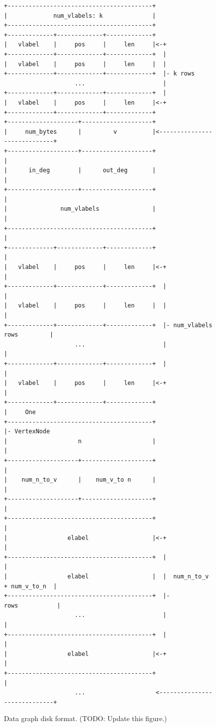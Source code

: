 \begin{figure}[ht]
  \centering
  \begin{verbatim}
+-----------------------------------------+
|             num_vlabels: k              |
+-----------------------------------------+
+-------------+-------------+-------------+
|   vlabel    |     pos     |     len     |<-+
+-------------+-------------+-------------+  |
|   vlabel    |     pos     |     len     |  |
+-------------+-------------+-------------+  |- k rows
                    ...                      |
+-------------+-------------+-------------+  |
|   vlabel    |     pos     |     len     |<-+
+-------------+-------------+-------------+
+--------------------+--------------------+
|     num_bytes      |         v          |<-----------------------------+
+--------------------+--------------------+                              |
|      in_deg        |      out_deg       |                              |
+--------------------+--------------------+                              |
|               num_vlabels               |                              |
+-----------------------------------------+                              |
+-------------+-------------+-------------+                              |
|   vlabel    |     pos     |     len     |<-+                           |
+-------------+-------------+-------------+  |                           |
|   vlabel    |     pos     |     len     |  |                           |
+-------------+-------------+-------------+  |- num_vlabels rows         |
                    ...                      |                           |
+-------------+-------------+-------------+  |                           |
|   vlabel    |     pos     |     len     |<-+                           |
+-------------+-------------+-------------+                              |     One
+-----------------------------------------+                              |- VertexNode
|                    n                    |                              |
+--------------------+--------------------+                              |
|    num_n_to_v      |    num_v_to n      |                              |
+--------------------+--------------------+                              |
+-----------------------------------------+                              |
|                 elabel                  |<-+                           |
+-----------------------------------------+  |                           |
|                 elabel                  |  |  num_n_to_v + num_v_to_n  |
+-----------------------------------------+  |-           rows           |
                    ...                      |                           |
+-----------------------------------------+  |                           |
|                 elabel                  |<-+                           |
+-----------------------------------------+                              |
                    ...                    <-----------------------------+

  \end{verbatim}
  \caption{Data graph disk format. (TODO\@: Update this figure.)}\label{img:data_disk_format}
\end{figure}

